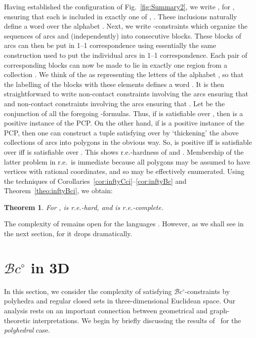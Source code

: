 \documentclass{article}
\newtheorem{theorem}{Theorem}
\newcommand{\cBci}{\ensuremath{\mathcal{B}c^\circ}}
\begin{document}
Having established the configuration of Fig.~\ref{fig:Summary2}, we
write , for , ensuring that each  is included in
exactly one of , . These inclusions naturally define a word
 over the alphabet .  Next, we write
-constraints which organize the sequences of arcs
 and  (independently) into consecutive
blocks. These blocks of arcs can then be put in 1--1 correspondence
using essentially the same construction used to put the individual
arcs in 1--1 correspondence. Each pair of corresponding blocks can now
be made to lie in exactly one region from a collection . We think of the  as representing the letters of the
alphabet , so that the labelling of the blocks with these elements
defines a word . It is then straightforward to write
non-contact constraints involving the arcs  ensuring that
 and non-contact constraints involving the arcs
 ensuring that . Let  be the
conjunction of all the foregoing -formulas. Thus, if 
is satisfiable over , then  is a positive instance of
the PCP. On the other hand, if  is a positive instance of the
PCP, then one can construct a tuple satisfying  over
 by `thickening' the above collections of arcs into
polygons in the obvious way. So,  is positive iff  is
satisfiable over  iff  is satisfiable over
. This shows r.e.-hardness of  and
.  Membership of the latter problem in r.e.~is
immediate because all polygons may be assumed to have vertices with
rational coordinates, and so may be effectively enumerated.  Using the
techniques of Corollaries~\ref{cor:inftyCci}--\ref{cor:inftyBc} and
Theorem~\ref{theo:inftyBci}, we obtain:
\begin{theorem}
\label{theo:undecidable}
For ,
 is r.e.-hard, and
 is r.e.-complete.
\end{theorem}

The complexity of  remains open for the
languages . However, as we
shall see in the next section, for  it drops dramatically.





\section{\cBci{} in 3D}\label{sec:3d}

In this section, we consider the complexity of satisfying
\cBci-constraints by polyhedra and regular closed sets in
three-dimensional Euclidean space. Our analysis rests on an important
connection between geometrical and graph-theoretic interpretations. We
begin by briefly discussing the results of~\cite{ijcai:kp-hwz10} for
the {\em polyhedral} case.
\end{document}
